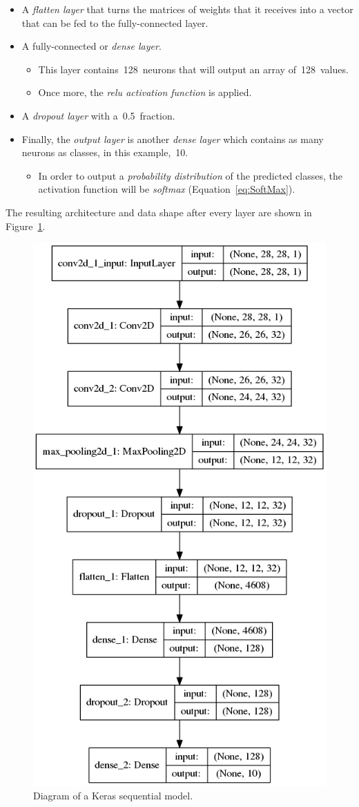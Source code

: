 \begin{itemize}
	\item A \emph{flatten layer} that turns the matrices of weights that it receives into a vector that can be fed to the fully-connected layer.
	\item A fully-connected or \emph{dense layer}.
	\begin{itemize}
		\item This layer contains~128~neurons that will output an array of~128~values.
		\item Once more, the \emph{\gls{relu} activation function} is applied.
	\end{itemize} 
	
	\item A \emph{dropout layer} with a~0.5~fraction.
	
	\item Finally, the \emph{output layer} is another \emph{dense layer} which contains as many neurons as classes, in this example,~10. 
	\begin{itemize}
		\item In order to output a \emph{probability distribution} of the predicted classes, the activation function will be \emph{softmax} (Equation~\ref{eq:SoftMax}).
	\end{itemize}
\end{itemize}

The resulting architecture and data shape after every layer are shown in Figure~\ref{fig:model}.

\begin{figure}
	\centering
	\includegraphics[width=0.6\linewidth, keepaspectratio]{figures/model.png}
	\caption{Diagram of a Keras sequential model.}
	\label{fig:model}
\end{figure}

